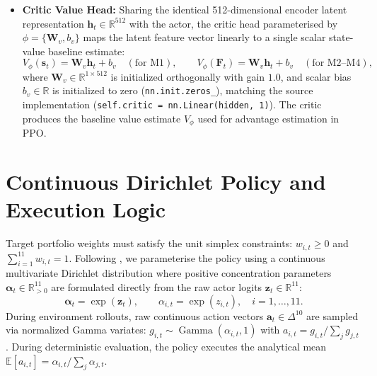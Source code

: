 \begin{itemize}
    \item \textbf{Critic Value Head:} Sharing the identical 512-dimensional encoder latent representation $\mathbf{h}_t \in \mathbb{R}^{512}$ with the actor, the critic head parameterised by $\phi = \{\mathbf{W}_v, b_v\}$ maps the latent feature vector linearly to a single scalar state-value baseline estimate:
    \begin{equation}
    V_\phi(\mathbf{s}_t) = \mathbf{W}_v \mathbf{h}_t + b_v \quad (\text{for M1}), \qquad V_\phi(\mathbf{F}_t) = \mathbf{W}_v \mathbf{h}_t + b_v \quad (\text{for M2--M4}),
    \end{equation}
    where $\mathbf{W}_v \in \mathbb{R}^{1 \times 512}$ is initialized orthogonally with gain $1.0$, and scalar bias $b_v \in \mathbb{R}$ is initialized to zero (\texttt{nn.init.zeros\_}), matching the source implementation (\texttt{self.critic = nn.Linear(hidden, 1)}). The critic produces the baseline value estimate $V_\phi$ used for advantage estimation in PPO.
\end{itemize}   

\section{Continuous Dirichlet Policy and Execution Logic}
Target portfolio weights must satisfy the unit simplex constraints: $w_{i,t} \ge 0$ and $\sum_{i=1}^{11} w_{i,t} = 1$. Following \citet{yang2022selective}, we parameterise the policy using a continuous multivariate Dirichlet distribution where positive concentration parameters $\boldsymbol{\alpha}_t \in \mathbb{R}^{11}_{>0}$ are formulated directly from the raw actor logits $\mathbf{z}_t \in \mathbb{R}^{11}$:
\begin{equation}
\boldsymbol{\alpha}_t = \exp(\mathbf{z}_t), \qquad \alpha_{i,t} = \exp(z_{i,t}), \quad i = 1, \dots, 11.
\end{equation}
During environment rollouts, raw continuous action vectors $\mathbf{a}_t \in \Delta^{10}$ are sampled via normalized Gamma variates: $g_{i,t} \sim \operatorname{Gamma}(\alpha_{i,t}, 1)$ with $a_{i,t} = g_{i,t} / \sum_j g_{j,t}$ \citep{yang2022selective}. During deterministic evaluation, the policy executes the analytical mean $\mathbb{E}[a_{i,t}] = \alpha_{i,t} / \sum_j \alpha_{j,t}$.

